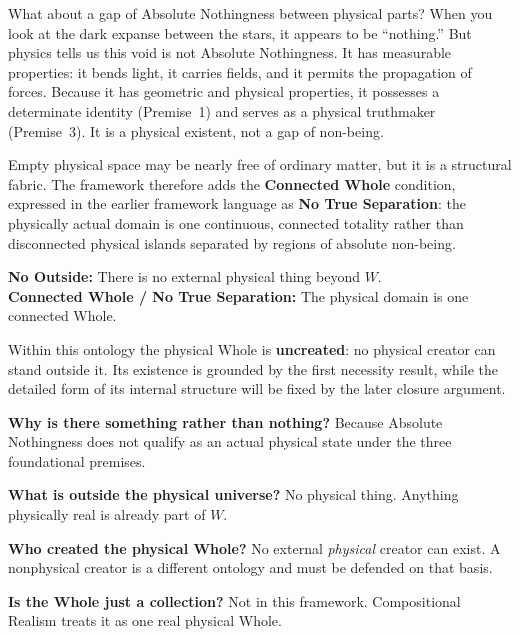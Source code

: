 \documentclass[11pt]{article}
\theoremstyle{canonstyle}
\begin{document}
What about a gap of Absolute Nothingness between physical parts? When you look at the dark expanse between the stars, it appears to be ``nothing.'' But physics tells us this void is not Absolute Nothingness. It has measurable properties: it bends light, it carries fields, and it permits the propagation of forces. Because it has geometric and physical properties, it possesses a determinate identity (Premise~1) and serves as a physical truthmaker (Premise~3). It is a physical existent, not a gap of non-being.

Empty physical space may be nearly free of ordinary matter, but it is a structural fabric. The framework therefore adds the \textbf{Connected Whole} condition, expressed in the earlier framework language as \textbf{No True Separation}: the physically actual domain is one continuous, connected totality rather than disconnected physical islands separated by regions of absolute non-being.

\begin{keyresult}
\textbf{No Outside:} There is no external physical thing beyond $W$.
\\
\textbf{Connected Whole / No True Separation:} The physical domain is one connected Whole.
\end{keyresult}

Within this ontology the physical Whole is \textbf{uncreated}: no physical creator can stand outside it. Its existence is grounded by the first necessity result, while the detailed form of its internal structure will be fixed by the later closure argument.

\begin{plainwords}
\textbf{Why is there something rather than nothing?} Because Absolute Nothingness does not qualify as an actual physical state under the three foundational premises.

\medskip

\textbf{What is outside the physical universe?} No physical thing. Anything physically real is already part of $W$.

\medskip

\textbf{Who created the physical Whole?} No external \emph{physical} creator can exist. A nonphysical creator is a different ontology and must be defended on that basis.

\medskip

\textbf{Is the Whole just a collection?} Not in this framework. Compositional Realism treats it as one real physical Whole.
\end{plainwords}
\end{document}
